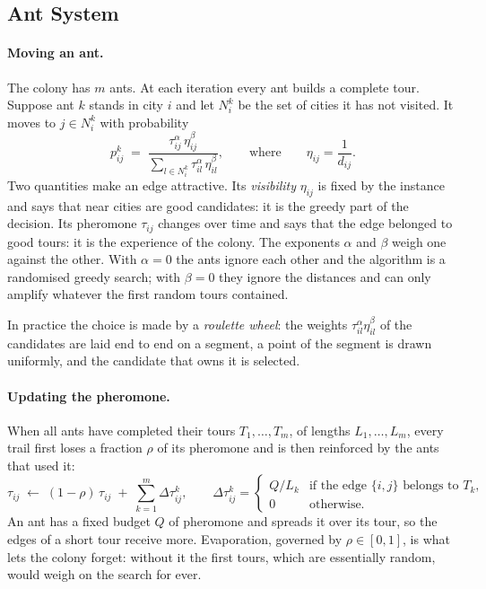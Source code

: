 \documentclass[11pt,a4paper]{article}
\begin{document}
\subsection{Ant System}
\label{sec:ant-system}

\paragraph{Moving an ant.}
The colony has $m$ ants. At each iteration every ant builds a complete tour. Suppose ant
$k$ stands in city $i$ and let $N_i^k$ be the set of cities it has not visited. It moves to
$j\in N_i^k$ with probability
\begin{equation}
    p_{ij}^{k} \;=\;
    \frac{\tau_{ij}^{\alpha}\,\eta_{ij}^{\beta}}
    {\displaystyle\sum_{l\in N_i^k}\tau_{il}^{\alpha}\,\eta_{il}^{\beta}},
    \qquad\text{where}\qquad \eta_{ij}=\frac{1}{d_{ij}}.
    \label{eq:transition}
\end{equation}
Two quantities make an edge attractive. Its \emph{visibility} $\eta_{ij}$ is fixed by the
instance and says that near cities are good candidates: it is the greedy part of the
decision. Its pheromone $\tau_{ij}$ changes over time and says that the edge belonged to
good tours: it is the experience of the colony. The exponents $\alpha$ and $\beta$ weigh one
against the other. With $\alpha=0$ the ants ignore each other and the algorithm is a
randomised greedy search; with $\beta=0$ they ignore the distances and can only amplify
whatever the first random tours contained.

In practice the choice is made by a \emph{roulette wheel}: the weights
$\tau_{il}^{\alpha}\eta_{il}^{\beta}$ of the candidates are laid end to end on a segment, a
point of the segment is drawn uniformly, and the candidate that owns it is selected.

\paragraph{Updating the pheromone.}
When all ants have completed their tours $T_1,\dots,T_m$, of lengths $L_1,\dots,L_m$, every
trail first loses a fraction $\rho$ of its pheromone and is then reinforced by the ants
that used it:
\begin{equation}
    \tau_{ij} \;\leftarrow\; (1-\rho)\,\tau_{ij} \;+\; \sum_{k=1}^{m}\Delta\tau_{ij}^{k},
    \qquad
    \Delta\tau_{ij}^{k} =
    \begin{cases}
        Q/L_k & \text{if the edge } \{i,j\} \text{ belongs to } T_k, \\
        0     & \text{otherwise.}
    \end{cases}
    \label{eq:update}
\end{equation}
An ant has a fixed budget $Q$ of pheromone and spreads it over its tour, so the edges of a
short tour receive more. Evaporation, governed by $\rho\in[0,1]$, is what lets the colony
forget: without it the first tours, which are essentially random, would weigh on the search
for ever.
\end{document}
